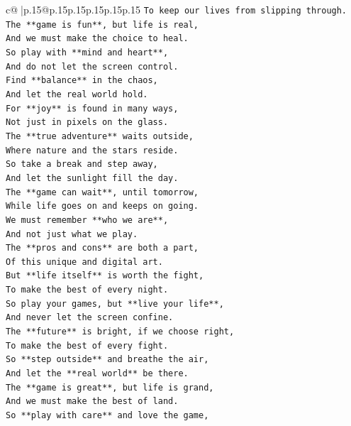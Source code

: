 \documentclass{article}
\begin{document}
{\begin{supertabular}{c@{$\;$}|p{.15\linewidth}@{}p{.15\linewidth}p{.15\linewidth}p{.15\linewidth}p{.15\linewidth}p{.15\linewidth}}
{{{\texttt{To keep our lives from slipping through.} \\
\texttt{The **game is fun**, but life is real,} \\
\texttt{And we must make the choice to heal.} \\
\texttt{So play with **mind and heart**,} \\
\texttt{And do not let the screen control.} \\
\texttt{Find **balance** in the chaos,} \\
\texttt{And let the real world hold.} \\
\texttt{For **joy** is found in many ways,} \\
\texttt{Not just in pixels on the glass.} \\
\texttt{The **true adventure** waits outside,} \\
\texttt{Where nature and the stars reside.} \\
\texttt{So take a break and step away,} \\
\texttt{And let the sunlight fill the day.} \\
\texttt{The **game can wait**, until tomorrow,} \\
\texttt{While life goes on and keeps on going.} \\
\texttt{We must remember **who we are**,} \\
\texttt{And not just what we play.} \\
\texttt{The **pros and cons** are both a part,} \\
\texttt{Of this unique and digital art.} \\
\texttt{But **life itself** is worth the fight,} \\
\texttt{To make the best of every night.} \\
\texttt{So play your games, but **live your life**,} \\
\texttt{And never let the screen confine.} \\
\texttt{The **future** is bright, if we choose right,} \\
\texttt{To make the best of every fight.} \\
\texttt{So **step outside** and breathe the air,} \\
\texttt{And let the **real world** be there.} \\
\texttt{The **game is great**, but life is grand,} \\
\texttt{And we must make the best of land.} \\
\texttt{So **play with care** and love the game,} \\
}}}
\end{supertabular}}
\end{document}
